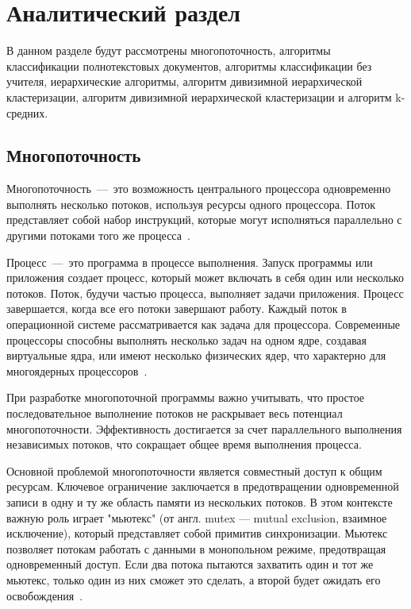 \chapter{Аналитический раздел}

В данном разделе будут рассмотрены многопоточность, алгоритмы классификации полнотекстовых документов, алгоритмы классификации без учителя, иерархические алгоритмы, алгоритм дивизимной иерархической кластеризации, алгоритм дивизимной иерархической кластеризации и алгоритм k-средних.

\section{Многопоточность}

Многопоточность~---~это возможность центрального процессора одновременно выполнять несколько потоков, используя ресурсы одного процессора. 
Поток представляет собой набор инструкций, которые могут исполняться параллельно с другими потоками того же процесса~\cite{multithreading}.

Процесс~---~это программа в процессе выполнения. Запуск программы или приложения создает процесс, который может включать в себя один или несколько потоков. Поток, будучи частью процесса, выполняет задачи приложения. Процесс завершается, когда все его потоки завершают работу. Каждый поток в операционной системе рассматривается как задача для процессора. Современные процессоры способны выполнять несколько задач на одном ядре, создавая виртуальные ядра, или имеют несколько физических ядер, что характерно для многоядерных процессоров~\cite{process}. 

При разработке многопоточной программы важно учитывать, что простое последовательное выполнение потоков не раскрывает весь потенциал многопоточности. 
Эффективность достигается за счет параллельного выполнения независимых потоков, что сокращает общее время выполнения процесса.

Основной проблемой многопоточности является совместный доступ к общим ресурсам. 
Ключевое ограничение заключается в предотвращении одновременной записи в одну и ту же область памяти из нескольких потоков.
В этом контексте важную роль играет "мьютекс" (от англ. mutex --- mutual exclusion, взаимное исключение), который представляет собой примитив синхронизации. Мьютекс позволяет потокам работать с данными в монопольном режиме, предотвращая одновременный доступ. 
Если два потока пытаются захватить один и тот же мьютекс, только один из них сможет это сделать, а второй будет ожидать его освобождения~\cite{process}.

